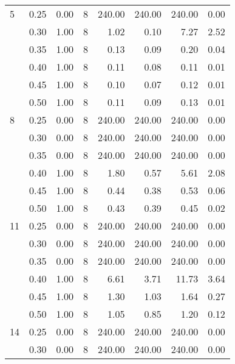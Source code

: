 \documentclass[11pt]{article}
\begin{document}
\begin{table}
\begin{tabular}{llrrrrrr}
    \midrule
    5  & 0.25 &           0.00 &              8 & 240.00 & 240.00 & 240.00 &      0.00 \\
    & 0.30 &           1.00 &              8 &   1.02 &   0.10 &   7.27 &      2.52 \\
    & 0.35 &           1.00 &              8 &   0.13 &   0.09 &   0.20 &      0.04 \\
    & 0.40 &           1.00 &              8 &   0.11 &   0.08 &   0.11 &      0.01 \\
    & 0.45 &           1.00 &              8 &   0.10 &   0.07 &   0.12 &      0.01 \\
    & 0.50 &           1.00 &              8 &   0.11 &   0.09 &   0.13 &      0.01 \\
    \midrule
    8  & 0.25 &           0.00 &              8 & 240.00 & 240.00 & 240.00 &      0.00 \\
    & 0.30 &           0.00 &              8 & 240.00 & 240.00 & 240.00 &      0.00 \\
    & 0.35 &           0.00 &              8 & 240.00 & 240.00 & 240.00 &      0.00 \\
    & 0.40 &           1.00 &              8 &   1.80 &   0.57 &   5.61 &      2.08 \\
    & 0.45 &           1.00 &              8 &   0.44 &   0.38 &   0.53 &      0.06 \\
    & 0.50 &           1.00 &              8 &   0.43 &   0.39 &   0.45 &      0.02 \\
    \midrule
    11 & 0.25 &           0.00 &              8 & 240.00 & 240.00 & 240.00 &      0.00 \\
    & 0.30 &           0.00 &              8 & 240.00 & 240.00 & 240.00 &      0.00 \\
    & 0.35 &           0.00 &              8 & 240.00 & 240.00 & 240.00 &      0.00 \\
    & 0.40 &           1.00 &              8 &   6.61 &   3.71 &  11.73 &      3.64 \\
    & 0.45 &           1.00 &              8 &   1.30 &   1.03 &   1.64 &      0.27 \\
    & 0.50 &           1.00 &              8 &   1.05 &   0.85 &   1.20 &      0.12 \\
    \midrule
    14 & 0.25 &           0.00 &              8 & 240.00 & 240.00 & 240.00 &      0.00 \\
    & 0.30 &           0.00 &              8 & 240.00 & 240.00 & 240.00 &      0.00 \\

\end{tabular}
\end{table}
\end{document}
